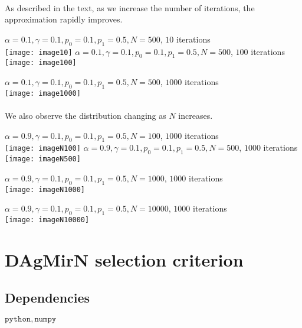\documentclass[11pt]{article}
\begin{document}
\paragraph{} As described in the text, as we increase the number of iterations, the approximation rapidly improves.

$\alpha = 0.1, \gamma = 0.1, p_0 = 0.1, p_1 = 0.5, N = 500$, $10$ iterations\\
\texttt{[image: image10]}
\clearpage
$\alpha = 0.1, \gamma = 0.1, p_0 = 0.1, p_1 = 0.5, N = 500$, $100$ iterations\\
\texttt{[image: image100]}

$\alpha = 0.1, \gamma = 0.1, p_0 = 0.1, p_1 = 0.5, N = 500$, $1000$ iterations\\
\texttt{[image: image1000]}

\paragraph{} We also observe the distribution changing as $N$ increases.

$\alpha = 0.9, \gamma = 0.1, p_0 = 0.1, p_1 = 0.5, N = 100$, $1000$ iterations\\
\texttt{[image: imageN100]}
\clearpage
$\alpha = 0.9, \gamma = 0.1, p_0 = 0.1, p_1 = 0.5, N = 500$, $1000$ iterations\\
\texttt{[image: imageN500]}

$\alpha = 0.9, \gamma = 0.1, p_0 = 0.1, p_1 = 0.5, N = 1000$, $1000$ iterations\\
\texttt{[image: imageN1000]}

$\alpha = 0.9, \gamma = 0.1, p_0 = 0.1, p_1 = 0.5, N = 10000$, $1000$ iterations\\
\texttt{[image: imageN10000]}

\clearpage
\section{DAgMirN selection criterion}
\subsection*{Dependencies} $\mathtt{python, numpy}$
\end{document}
